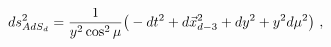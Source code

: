 \begin{equation}
ds^2_{AdS_d} = {1\over y^2\cos^2\mu} 
 \big( -dt^2 + d\vec{x}_{d-3}^2 +dy^2 +y^2 d\mu^2\big)\ ,
\label{adsseven}
\end{equation}

